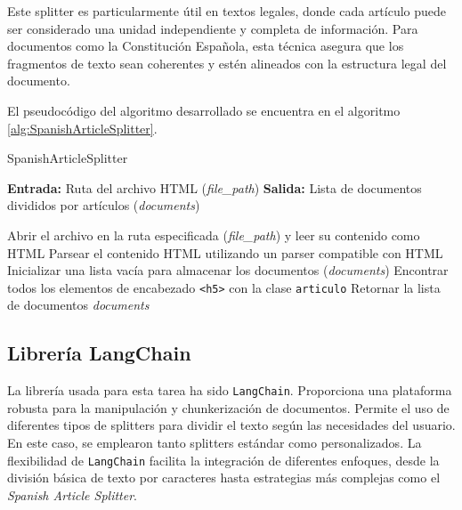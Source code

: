 Este splitter es particularmente útil en textos legales, donde cada artículo puede ser considerado una unidad independiente y completa de información. Para documentos como la Constitución Española, esta técnica asegura que los fragmentos de texto sean coherentes y estén alineados con la estructura legal del documento.

El pseudocódigo del algoritmo desarrollado se encuentra en el algoritmo \ref{alg:SpanishArticleSplitter}.


\begin{algorithm}
\caption{SpanishArticleSplitter}\label{alg:SpanishArticleSplitter}
\textbf{Entrada:} Ruta del archivo HTML (\textit{file\_path}) \;
\textbf{Salida:} Lista de documentos divididos por artículos (\textit{documents}) \;

Abrir el archivo en la ruta especificada (\textit{file\_path}) y leer su contenido como HTML\;
Parsear el contenido HTML utilizando un parser compatible con HTML\;
Inicializar una lista vacía para almacenar los documentos (\textit{documents})\;
Encontrar todos los elementos de encabezado \texttt{<h5>} con la clase \texttt{articulo}\;
Retornar la lista de documentos \textit{documents}\;
\end{algorithm}

\subsection{Librería LangChain}
La librería usada para esta tarea ha sido \texttt{LangChain}. Proporciona una plataforma robusta para la manipulación y chunkerización de documentos. Permite el uso de diferentes tipos de splitters para dividir el texto según las necesidades del usuario. En este caso, se emplearon tanto splitters estándar como personalizados. La flexibilidad de \texttt{LangChain} facilita la integración de diferentes enfoques, desde la división básica de texto por caracteres hasta estrategias más complejas como el \textit{Spanish Article Splitter}.

